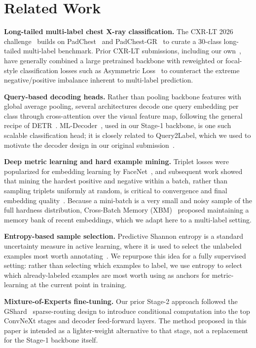 \documentclass[conference]{IEEEtran}
\begin{document}
\section{Related Work}
\textbf{Long-tailed multi-label chest X-ray classification.} The CXR-LT 2026 challenge~\cite{b12} builds on PadChest~\cite{b9} and PadChest-GR~\cite{b10} to curate a 30-class long-tailed multi-label benchmark. Prior CXR-LT submissions, including our own~\cite{b12}, have generally combined a large pretrained backbone with reweighted or focal-style classification losses such as Asymmetric Loss~\cite{b3} to counteract the extreme negative/positive imbalance inherent to multi-label prediction.

\textbf{Query-based decoding heads.} Rather than pooling backbone features with global average pooling, several architectures decode one query embedding per class through cross-attention over the visual feature map, following the general recipe of DETR~\cite{b13}. ML-Decoder~\cite{b2}, used in our Stage-1 backbone, is one such scalable classification head; it is closely related to Query2Label, which we used to motivate the decoder design in our original submission~\cite{b12}.

\textbf{Deep metric learning and hard example mining.} Triplet losses were popularized for embedding learning by FaceNet~\cite{b4}, and subsequent work showed that mining the hardest positive and negative within a batch, rather than sampling triplets uniformly at random, is critical to convergence and final embedding quality~\cite{b5}. Because a mini-batch is a very small and noisy sample of the full hardness distribution, Cross-Batch Memory (XBM)~\cite{b6} proposed maintaining a memory bank of recent embeddings, which we adapt here to a multi-label setting.

\textbf{Entropy-based sample selection.} Predictive Shannon entropy is a standard uncertainty measure in active learning, where it is used to select the unlabeled examples most worth annotating~\cite{b7}. We repurpose this idea for a fully supervised setting: rather than selecting which examples to label, we use entropy to select which already-labeled examples are most worth using as anchors for metric-learning at the current point in training.

\textbf{Mixture-of-Experts fine-tuning.} Our prior Stage-2 approach followed the GShard~\cite{b8} sparse-routing design to introduce conditional computation into the top ConvNeXt stages and decoder feed-forward layers. The method proposed in this paper is intended as a lighter-weight alternative to that stage, not a replacement for the Stage-1 backbone itself.
\end{document}
